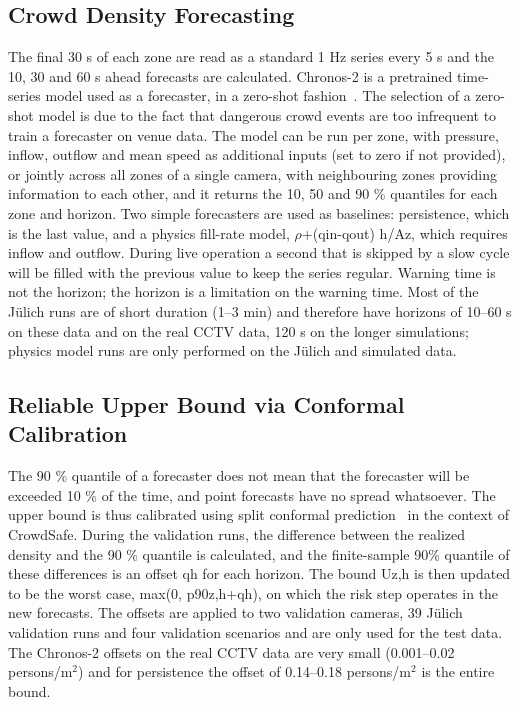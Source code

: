 \documentclass[conference]{IEEEtran}
\newcommand{\pmsq}{persons/m$^2$}
\begin{document}
\subsection{Crowd Density Forecasting}
The final 30 s of each zone are read as a standard 1 Hz series every 5 s and the 10, 30 and 60 s ahead forecasts are calculated. Chronos-2 is a pretrained time-series model used as a forecaster, in a zero-shot fashion~\cite{ansari2025chronos2}. The selection of a zero-shot model is due to the fact that dangerous crowd events are too infrequent to train a forecaster on venue data. The model can be run per zone, with pressure, inflow, outflow and mean speed as additional inputs (set to zero if not provided), or jointly across all zones of a single camera, with neighbouring zones providing information to each other, and it returns the 10, 50 and 90 \% quantiles for each zone and horizon. Two simple forecasters are used as baselines: persistence, which is the last value, and a physics fill-rate model, $\rho$+(qin-qout) h/Az, which requires inflow and outflow. During live operation a second that is skipped by a slow cycle will be filled with the previous value to keep the series regular. Warning time is not the horizon; the horizon is a limitation on the warning time. Most of the J\"ulich runs are of short duration (1--3 min) and therefore have horizons of 10--60 s on these data and on the real CCTV data, 120 s on the longer simulations; physics model runs are only performed on the J\"ulich and simulated data.

\subsection{Reliable Upper Bound via Conformal Calibration}
The 90 \% quantile of a forecaster does not mean that the forecaster will be exceeded 10 \% of the time, and point forecasts have no spread whatsoever. The upper bound is thus calibrated using split conformal prediction~\cite{angelopoulos2023conformal} in the context of CrowdSafe. During the validation runs, the difference between the realized density and the 90 \% quantile is calculated, and the finite-sample 90\% quantile of these differences is an offset qh for each horizon. The bound Uz,h is then updated to be the worst case, max(0, p90z,h+qh), on which the risk step operates in the new forecasts. The offsets are applied to two validation cameras, 39 J\"ulich validation runs and four validation scenarios and are only used for the test data. The Chronos-2 offsets on the real CCTV data are very small (0.001--0.02 \pmsq{}) and for persistence the offset of 0.14--0.18 \pmsq{} is the entire bound.
\end{document}
